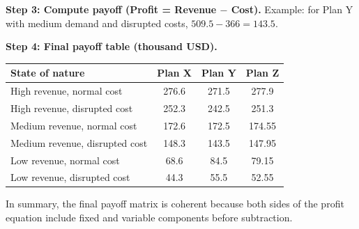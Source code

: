 \begin{ExamProblems}
		\textbf{Step 3: Compute payoff (Profit = Revenue $-$ Cost).}
		Example: for Plan Y with medium demand and disrupted costs,
		\(509.5-366=143.5\).
		
		\textbf{Step 4: Final payoff table (thousand USD).}
		\begin{center}
			\begin{tabular}{l c c c}
				\toprule
				State of nature & Plan X & Plan Y & Plan Z \\
				\midrule
				High revenue, normal cost & 276.6 & 271.5 & 277.9 \\
				High revenue, disrupted cost & 252.3 & 242.5 & 251.3 \\
				Medium revenue, normal cost & 172.6 & 172.5 & 174.55 \\
				Medium revenue, disrupted cost & 148.3 & 143.5 & 147.95 \\
				Low revenue, normal cost & 68.6 & 84.5 & 79.15 \\
				Low revenue, disrupted cost & 44.3 & 55.5 & 52.55 \\
				\bottomrule
			\end{tabular}
		\end{center}
		
		In summary, the final payoff matrix is coherent because both sides of the profit equation include fixed and variable components before subtraction.
	\end{ExamProblems}

